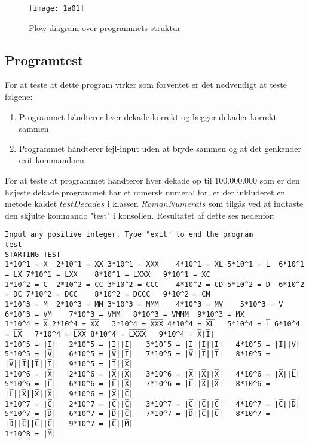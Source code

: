 	\begin{figure}[h!]
	  \centering
	      \texttt{[image: 1a01]}
	  \caption{Flow diagram over programmets struktur}\label{fig:1a01}
	\end{figure}
		 
	



\subsection{Programtest}
	For at teste at dette program virker som forventet er det nødvendigt at teste følgene:
 	\begin{enumerate}
 		\item Programmet håndterer hver dekade korrekt og lægger dekader korrekt sammen
 		\item Programmet håndterer fejl-input uden at bryde sammen og at det genkender exit kommandoen
 	\end{enumerate}
 	For at teste at programmet håndterer hver dekade op til 100.000.000 som er den højeste dekade programmet har et romersk numeral for, er der inkluderet en metode kaldet $testDecades$ i klassen $RomanNumerals$ som tilgås ved at indtaste den skjulte kommando "test" i konsollen. Resultatet af dette ses nedenfor:
	\begin{lstlisting}[caption=output fra kørsel af testDecades]
Input any positive integer. Type "exit" to end the program
test
STARTING TEST
1*10^1 = X	2*10^1 = XX	3*10^1 = XXX	4*10^1 = XL	5*10^1 = L	6*10^1 = LX	7*10^1 = LXX	8*10^1 = LXXX	9*10^1 = XC	
1*10^2 = C	2*10^2 = CC	3*10^2 = CCC	4*10^2 = CD	5*10^2 = D	6*10^2 = DC	7*10^2 = DCC	8*10^2 = DCCC	9*10^2 = CM	
1*10^3 = M	2*10^3 = MM	3*10^3 = MMM	4*10^3 = MV̅	5*10^3 = V̅	6*10^3 = V̅M	7*10^3 = V̅MM	8*10^3 = V̅MMM	9*10^3 = MX̅	
1*10^4 = X̅	2*10^4 = X̅X̅	3*10^4 = X̅X̅X̅	4*10^4 = X̅L̅	5*10^4 = L̅	6*10^4 = L̅X̅	7*10^4 = L̅X̅X̅	8*10^4 = L̅X̅X̅X̅	9*10^4 = X̅|I̅|	
1*10^5 = |I̅|	2*10^5 = |I̅||I̅|	3*10^5 = |I̅||I̅||I̅|	4*10^5 = |I̅||V̅|	5*10^5 = |V̅|	6*10^5 = |V̅||I̅|	7*10^5 = |V̅||I̅||I̅|	8*10^5 = |V̅||I̅||I̅||I̅|	9*10^5 = |I̅||X̅|	
1*10^6 = |X̅|	2*10^6 = |X̅||X̅|	3*10^6 = |X̅||X̅||X̅|	4*10^6 = |X̅||L̅|	5*10^6 = |L̅|	6*10^6 = |L̅||X̅|	7*10^6 = |L̅||X̅||X̅|	8*10^6 = |L̅||X̅||X̅||X̅|	9*10^6 = |X̅||C̅|	
1*10^7 = |C̅|	2*10^7 = |C̅||C̅|	3*10^7 = |C̅||C̅||C̅|	4*10^7 = |C̅||D̅|	5*10^7 = |D̅|	6*10^7 = |D̅||C̅|	7*10^7 = |D̅||C̅||C̅|	8*10^7 = |D̅||C̅||C̅||C̅|	9*10^7 = |C̅||M̅|	
1*10^8 = |M̅|	  
	\end{lstlisting}
